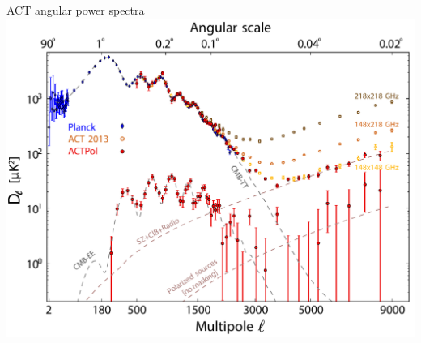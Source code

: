 \documentclass[table]{beamer}
\begin{document}
\begin{frame}{ACT angular power spectra}
	\centering
	\includegraphics[width=\textwidth]{tteepaper.pdf}
\end{frame}
\end{document}
